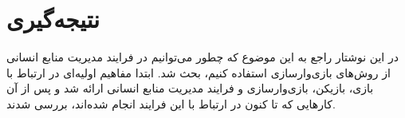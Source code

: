 \chapter{نتیجه‌گیری}
در این نوشتار راجع به این موضوع که چطور می‌توانیم در فرایند مدیریت منابع انسانی از روش‌های بازی‌وارسازی استفاده کنیم، بحث شد. ابتدا مفاهیم اولیه‌ای در ارتباط با بازی، بازیکن، بازی‌وارسازی و فرایند مدیریت منابع انسانی ارائه شد و پس از آن کارهایی که تا کنون در ارتباط با این فرایند انجام شده‌اند، بررسی شدند.